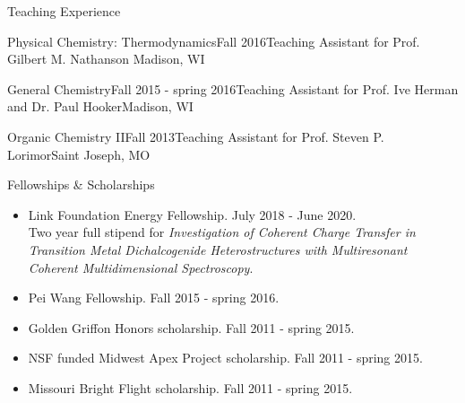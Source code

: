 \documentclass{resume} %
\begin{document}


\begin{rSection}{Teaching Experience}
	
\begin{rSubsectionlistless}{Physical Chemistry: Thermodynamics}{Fall 2016}{Teaching Assistant for Prof. Gilbert M. Nathanson }{Madison, WI}
\end{rSubsectionlistless}

\begin{rSubsectionlistless}{General Chemistry}{Fall 2015 - spring 2016}{Teaching Assistant for Prof. Ive Herman and Dr. Paul Hooker}{Madison, WI}
\end{rSubsectionlistless}

\begin{rSubsectionlistless}{Organic Chemistry II}{Fall 2013}{Teaching Assistant for Prof. Steven P. Lorimor}{Saint Joseph, MO}
\end{rSubsectionlistless}

\end{rSection}


\begin{rSection}{Fellowships \& Scholarships}
	
\begin{itemize}[leftmargin = 0 pt]
	\item Link Foundation Energy Fellowship. July 2018 - June 2020. \\
	Two year full stipend for \emph{Investigation of Coherent Charge Transfer in Transition Metal Dichalcogenide Heterostructures with Multiresonant Coherent Multidimensional Spectroscopy}.
	\item Pei Wang Fellowship. Fall 2015 - spring 2016.
	\item Golden Griffon Honors scholarship. Fall 2011 - spring 2015.
	\item NSF funded Midwest Apex Project scholarship. Fall 2011 - spring 2015.
	\item Missouri Bright Flight scholarship. Fall 2011 - spring 2015.
\end{itemize}
	
\end{rSection}
\end{document}
